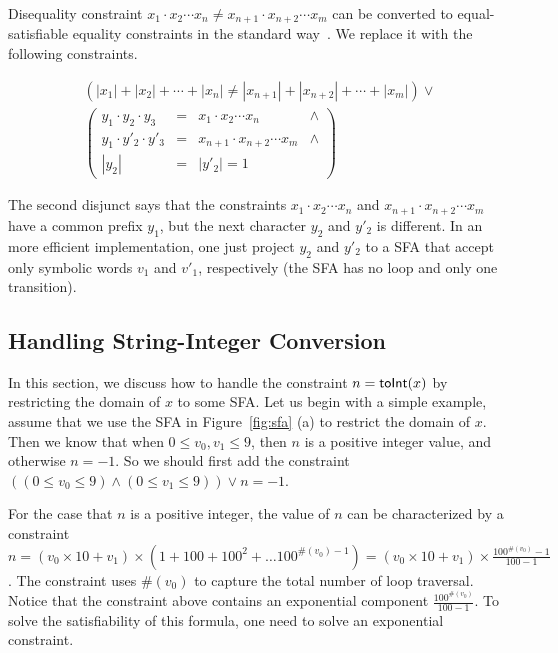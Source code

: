 \documentclass[sigplan,review,anonymous]{acmart}\settopmatter{printfolios=true,printccs=false,printacmref=false}
\begin{document}
Disequality constraint $x_1\cdot x_2 \cdots x_n \neq x_{n+1}\cdot x_{n+2} \cdots x_m$ can be converted to equal-satisfiable equality constraints in the standard way~\cite{abdulla2015norn}. We replace it with the following constraints.

$$
\begin{array}{c}
(|x_1|+ |x_2|+ \cdots +|x_n| \neq |x_{n+1}| + |x_{n+2}|+ \cdots +|x_m|)\vee \\
\left(
	\begin{array}{cccc}
	
	 y_1\cdot y_2\cdot y_3 &=& x_1\cdot x_2 \cdots x_n &\wedge\\
	 y_1 \cdot y'_2 \cdot y'_3 &=& x_{n+1}\cdot x_{n+2} \cdots x_m &\wedge\\
	|y_2|&=&|y'_2|=1
	\end{array}

\right)
\end{array}
$$

The second disjunct says that the constraints $x_1\cdot x_2 \cdots x_n$ and $x_{n+1}\cdot x_{n+2} \cdots x_m$ have a common prefix $y_1$, but the next character $y_2$ and $y'_2$ is different. In an more efficient implementation, one just project $y_2$ and $y'_2$ to a SFA that accept only symbolic words $v_1$ and $v'_1$, respectively (the SFA has no loop and only one transition). 








\subsection{Handling String-Integer Conversion} \label{section:s2i}

In this section, we discuss how to handle the constraint $n=\mbox{\textsf{toInt}($x$)}$ by restricting the domain of $x$ to some SFA. Let us begin with a simple example, assume that we use the SFA in Figure~\ref{fig:sfa} (a) to restrict the domain of $x$. Then we know that when $0\leq v_0,v_1 \leq 9$, then $n$ is a positive integer value, and otherwise $n =-1$. So we should first add the constraint $ ((0\leq v_0\leq 9) \wedge (0\leq v_1\leq 9)) \vee n=-1 $.

For the case that $n$ is a positive integer, the value of $n$ can be characterized by a constraint $n= (v_0\times 10+ v_1) \times (1+100 +100^2 + \ldots 100 ^{\#(v_0)-1})=  (v_0\times 10+ v_1) \times \frac{100^{\#(v_0)}-1}{100-1}$. 
The constraint uses $\#(v_0)$ to capture the total number of loop traversal.
Notice that the constraint above contains an exponential component $\frac{100^{\#(v_0)}}{100-1}$. To solve the satisfiability of this formula, one need to solve an exponential constraint. 
\end{document}
